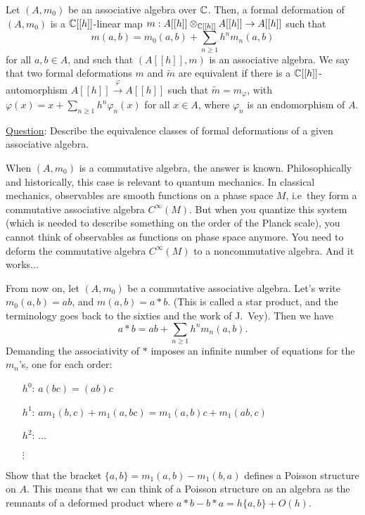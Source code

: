    Let $(A,m_0)$ be an
  associative algebra over $\mathbb{C}$. Then, a formal deformation of $(A,m_0)$ is a
  $\mathbb{C}[[h]]$-linear map $m:A[[h]]\otimes_{\mathbb{C}[[h]]} A[[h]] \to A[[h]]$ such that
  \[
   m(a,b) = m_0(a,b) + \sum_{n\ge 1} h^n m_n(a,b)
  \]
  for all $a,b\in A$, and such that $(A[[h]],m)$ is an associative algebra. We say
  that two formal deformations $m$ and $\tilde m$ are equivalent if there is a
  $\mathbb{C}[[h]]$-automorphism $A[[h]]\xrightarrow{\varphi} A[[h]]$ such that $\tilde m =
  m_\varphi$, with $\varphi(x) = x + \sum_{n\ge 1} h^n \varphi_n(x)$ for all $x\in
  A$, where $\varphi_n$ is an endomorphism of $A$.

  \smallskip
  \noindent \underline{Question}: Describe the equivalence classes of formal
  deformations of a given associative algebra.

   When $(A,m_0)$ is a commutative algebra, the answer is known. Philosophically and
   historically, this case is relevant to quantum mechanics. In classical mechanics,
   observables are smooth functions on a phase space $M$, i.e\ they form a commutative
   associative algebra $C^\infty(M)$. But when you quantize this system (which is
   needed to describe something on the order of the Planck scale), you cannot think of
   observables as functions on phase space anymore. You need to deform the commutative
   algebra $C^\infty(M)$ to a noncommutative algebra. And it works...

   From now on, let $(A,m_0)$ be a commutative associative algebra. Let's write
   $m_0(a,b)=ab$, and $m(a,b)=a\ast b$. (This is called a star product, and the terminology goes back to the sixties and the work of J.~Vey).
   Then we have
   \[
    a\ast b = ab + \sum_{n\ge 1} h^n m_n(a,b).
   \]
   Demanding the associativity of $\ast$ imposes an infinite number of equations for
   the $m_n$'s, one for each order:
   \begin{itemize}
   \item[$h^0$:] $a(bc)=(ab)c$
   \item[$h^1$:] $am_1(b,c) + m_1(a,bc) = m_1(a,b)c+m_1(ab,c)$
   \item[$h^2$:] $\dots$ 
   \item[$\vdots$]
   \end{itemize}

   \begin{exercise}
   Show that the bracket $\{a,b\} = m_1(a,b)-m_1(b,a)$ defines a Poisson structure on
   $A$. This means that we can think of a Poisson structure on an algebra as the
   remnants of a deformed product where $a\ast b-b\ast a = h\{a,b\} + O(h)$.
   \end{exercise}

